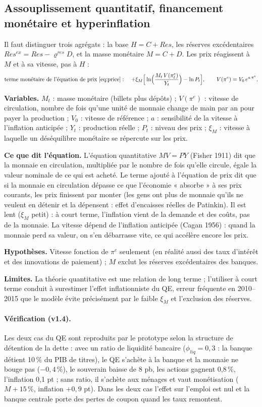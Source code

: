 \documentclass[11pt,a4paper]{article}
\newcommand{\variables}{\par\noindent\textbf{Variables.} }
\newcommand{\sens}{\par\noindent\textbf{Ce que dit l'équation.} }
\newcommand{\hyp}{\par\noindent\textbf{Hypothèses.} }
\newcommand{\limites}{\par\noindent\textbf{Limites.} }
\begin{document}
\subsection{Assouplissement quantitatif, financement monétaire et hyperinflation}
\label{sec:qe}
Il faut distinguer trois agrégats : la base $H = C + Res$, les réserves excédentaires $Res^{ex} = Res - \varrho^{res} D$, et la masse monétaire $M = C + D$. Les prix réagissent à $M$ et à sa vitesse, pas à $H$ :
\begin{equation}
\text{terme monétaire de l'équation de prix \eqref{eq:price}} : \quad + \xi_M \Big[\ln\!\Big(\frac{M_t\, V(\pi^e_t)}{Y_t}\Big) - \ln P_t\Big], \qquad V(\pi^e) = V_0\, e^{a\,\pi^e} .
\label{eq:monterm}
\end{equation}
\begin{lecture}
\variables $M_t$ : masse monétaire (billets plus dépôts) ; $V(\pi^e)$ : vitesse de circulation, nombre de fois qu'une unité de monnaie change de main par an pour payer la production ; $V_0$ : vitesse de référence ; $a$ : sensibilité de la vitesse à l'inflation anticipée ; $Y_t$ : production réelle ; $P_t$ : niveau des prix ; $\xi_M$ : vitesse à laquelle un déséquilibre monétaire se répercute sur les prix.
\sens L'équation quantitative $MV=PY$ (Fisher 1911) dit que la monnaie en circulation, multipliée par le nombre de fois qu'elle circule, égale la valeur nominale de ce qui est acheté. Le terme ajouté à l'équation de prix dit que si la monnaie en circulation dépasse ce que l'économie « absorbe » à ses prix courants, les prix finissent par monter (les gens ont plus de monnaie qu'ils ne veulent en détenir et la dépensent : effet d'encaisses réelles de Patinkin). Il est lent ($\xi_M$ petit) : à court terme, l'inflation vient de la demande et des coûts, pas de la monnaie. La vitesse dépend de l'inflation anticipée (Cagan 1956) : quand la monnaie perd sa valeur, on s'en débarrasse vite, ce qui accélère encore les prix.
\hyp Vitesse fonction de $\pi^e$ seulement (en réalité aussi des taux d'intérêt et des innovations de paiement) ; $M$ exclut les réserves excédentaires des banques.
\limites La théorie quantitative est une relation de long terme ; l'utiliser à court terme conduit à surestimer l'effet inflationniste du QE, erreur fréquente en 2010--2015 que le modèle évite précisément par le faible $\xi_M$ et l'exclusion des réserves.
\paragraph{Vérification (v1.4).} Les deux cas du QE sont reproduits par le prototype selon la structure de détention de la dette : avec un ratio de liquidité bancaire ($\phi_{liq}=0{,}3$ : la banque détient 10\,\% du PIB de titres), le QE s'achète à la banque et la monnaie ne bouge pas ($-0{,}4\,\%$), le souverain baisse de 8 pb, les actions gagnent 0,8\,\%, l'inflation 0,1 pt ; sans ratio, il s'achète aux ménages et vaut monétisation ($M+15\,\%$, inflation $+0{,}9$ pt). Dans les deux cas l'effet sur l'emploi est nul et la banque centrale porte des pertes de coupon quand les taux remontent.

\end{lecture}
\end{document}
